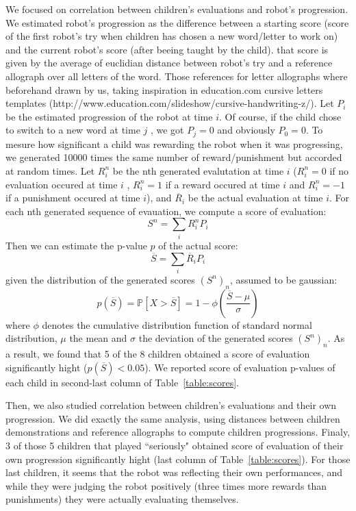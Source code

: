 \documentclass{sig-alternate}
\begin{document}
We focused on correlation between children's evaluations and robot's progression.
We estimated robot's progression as the difference between a starting score
(score of the first robot's try when children has chosen a new word/letter to
work on) and the current robot's score (after beeing taught by the child). that
score is given by the average of euclidian
distance between robot's try and a reference allograph over all letters of the
word. Those references for letter allographs where beforehand drawn by
us, taking inspiration in education.com cursive letters templates
(http://www.education.com/slideshow/cursive-handwriting-z/). Let $P_i$ be the
estimated progression of the robot at time $ i$. Of course, if the child
chose to switch to a new word at time $ j$ , we got $ P_{j}=0$ and obviously $
P_0=0$.
To mesure how significant a child was rewarding the robot when it was
progressing, we generated 10000 times the same number of reward/punishment
but accorded at random times. Let $ R_i^n$ be the nth generated evalutation at
time $ i$ ($ R_i^n = 0$ if
no evaluation occured at time $ i$ , $ R_i^n=1$ if a reward occured at time
$i$ and $R_i^n=-1$ if a punishment occured at time $i$), and $\overline{R}_i$ be the
actual evaluation at time $i$. For each nth generated sequence of evauation, we
compute a score of evaluation: $$ S^n = \sum\limits_i{R_i^n P_i}$$ 
Then we can estimate the p-value $p$ of the actual score: $$ \overline{S} =
\sum\limits_i{\overline{R}_i P_i}$$ 
given the distribution of the generated scores $\left(S^n\right)_n$, assumed to
be gaussian: 
$$p(\overline{S})= \mathbb{P}{\left[X>\overline{S}\right]} = 1-\phi{\left(\frac{\overline{S}-\mu}{\sigma}\right)}$$
where $\phi$ denotes the cumulative distribution function of standard normal
distribution, $\mu$ the mean and $\sigma$ the deviation of the generated 
scores $\left(S^n\right)_n$. 
As a result, we found that 5 of the 8 children obtained a score of evaluation
significantly hight ($p(\overline{S})<0.05$). We reported score of evaluation
p-values of each child in second-last column of Table~\ref{table:scores}.

Then, we also studied correlation between children's evaluations and their own
progression. We did exactly the same analysis, using distances between children
demonstrations and reference allographs to compute children progressions.
Finaly, 3 of those 5 children that played ``seriously" obtained score of evaluation of their own
progression significantly hight (last column of Table~\ref{table:scores}). For
those last children, it seems that the robot was reflecting their own performances, and while they
were judging the robot positively (three times more rewards than punishments)
they were actually evaluating themselves.
\end{document}

